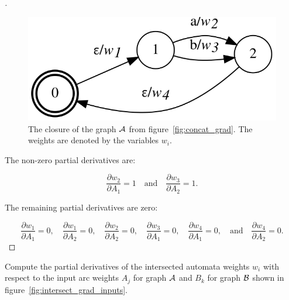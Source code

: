 \begin{proof}[\unskip\nopunct]

\begin{figure}
    \centering
    \includegraphics[scale=\dotscale]{figures/closure_grad}
    \caption{The closure of the graph $\mathcal{A}$ from figure~\ref{fig:concat_grad}.
    The weights are denoted by the variables $w_i$.}
    \label{fig:closure_grad}
\end{figure}

The non-zero partial derivatives are:

$$
\frac{\partial w_2}{\partial A_1} = 1
    \quad \textrm{and} \quad \frac{\partial w_3}{\partial A_2} = 1.
$$

The remaining partial derivatives are zero:

$$
\frac{\partial w_1}{\partial A_1} = 0, \quad \frac{\partial w_1}{\partial A_2} = 0,
    \quad \frac{\partial w_2}{\partial A_2} = 0,
    \quad \frac{\partial w_3}{\partial A_1} = 0,
    \quad \frac{\partial w_4}{\partial A_1} = 0,
    \quad \textrm{and} \quad \frac{\partial w_4}{\partial A_2} = 0.
$$
\end{proof}

\begin{example}
Compute the partial derivatives of the intersected automata weights $w_i$ with
respect to the input arc weights $A_j$ for graph $\mathcal{A}$ and $B_k$ for graph
$\mathcal{B}$ shown in figure~\ref{fig:intersect_grad_inputs}.
\end{example}

